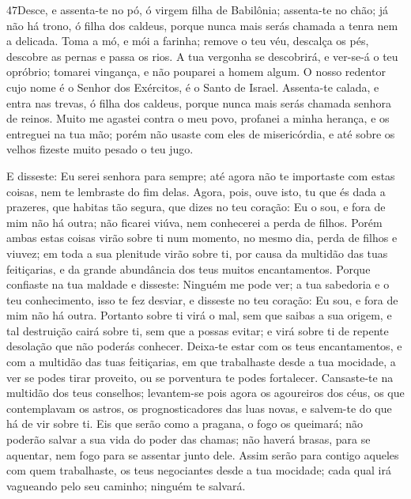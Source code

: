 \medskip

\lettrine{47}{}Desce, e assenta-te no pó, ó virgem filha de
Babilônia; assenta-te no chão; já não há trono, ó filha dos caldeus,
porque nunca mais serás chamada a tenra nem a delicada. Toma a
mó, e mói a farinha; remove o teu véu, descalça os pés, descobre as
pernas e passa os rios. A tua vergonha se descobrirá, e ver-se-á
o teu opróbrio; tomarei vingança, e não pouparei a homem algum.
O nosso redentor cujo nome é o Senhor dos Exércitos, é o Santo
de Israel. Assenta-te calada, e entra nas trevas, ó filha dos
caldeus, porque nunca mais serás chamada senhora de reinos.
Muito me agastei contra o meu povo, profanei a minha herança, e
os entreguei na tua mão; porém não usaste com eles de misericórdia,
e até sobre os velhos fizeste muito pesado o teu jugo.

E disseste: Eu serei senhora para sempre; até agora não te
importaste com estas coisas, nem te lembraste do fim delas.
Agora, pois, ouve isto, tu que és dada a prazeres, que habitas
tão segura, que dizes no teu coração: Eu o sou, e fora de mim não há
outra; não ficarei viúva, nem conhecerei a perda de filhos.
Porém ambas estas coisas virão sobre ti num momento, no mesmo
dia, perda de filhos e viuvez; em toda a sua plenitude virão sobre
ti, por causa da multidão das tuas feitiçarias, e da grande
abundância dos teus muitos encantamentos. Porque confiaste na
tua maldade e disseste: Ninguém me pode ver; a tua sabedoria e o teu
conhecimento, isso te fez desviar, e disseste no teu coração: Eu
sou, e fora de mim não há outra. Portanto sobre ti virá o
mal, sem que saibas a sua origem, e tal destruição cairá sobre ti,
sem que a possas evitar; e virá sobre ti de repente desolação que
não poderás conhecer. Deixa-te estar com os teus
encantamentos, e com a multidão das tuas feitiçarias, em que
trabalhaste desde a tua mocidade, a ver se podes tirar proveito, ou
se porventura te podes fortalecer. Cansaste-te na multidão
dos teus conselhos; levantem-se pois agora os agoureiros dos céus,
os que contemplavam os astros, os prognosticadores das luas novas, e
salvem-te do que há de vir sobre ti. Eis que serão como a
pragana, o fogo os queimará; não poderão salvar a sua vida do poder
das chamas; não haverá brasas, para se aquentar, nem fogo para se
assentar junto dele. Assim serão para contigo aqueles com
quem trabalhaste, os teus negociantes desde a tua mocidade; cada
qual irá vagueando pelo seu caminho; ninguém te salvará.

\medskip

